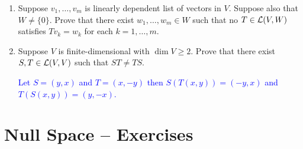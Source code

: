 \documentclass[10pt,a4paper]{report}
\newcommand{\BLUE}[1]{\textcolor{blue}{#1}}
\begin{document}
\begin{enumerate}
\item Suppose $v_1, \dots,v_m$ is linearly dependent list of vectors in $V$.  Suppose also that $W \ne \{0\}$.  Prove that there exist $w_1,\dots,w_m \in W$ such that no $T \in \mathcal{L}(V,W)$ satisfies $Tv_k=w_k$ for each $k=1,\dots,m$.

\item Suppose $V$ is finite-dimensional with $\dim V \ge 2$.  Prove that there exist $S,T \in\mathcal{L}(V,V)$ such that $ST \ne TS$.

\BLUE{Let $S=(y,x)$ and $T=(x,-y)$  then $S(T(x,y)) = (-y,x)$ and $T(S(x,y))= (y,-x)$.}

\end{enumerate}

\section{Null Space -- Exercises}
\end{document}
